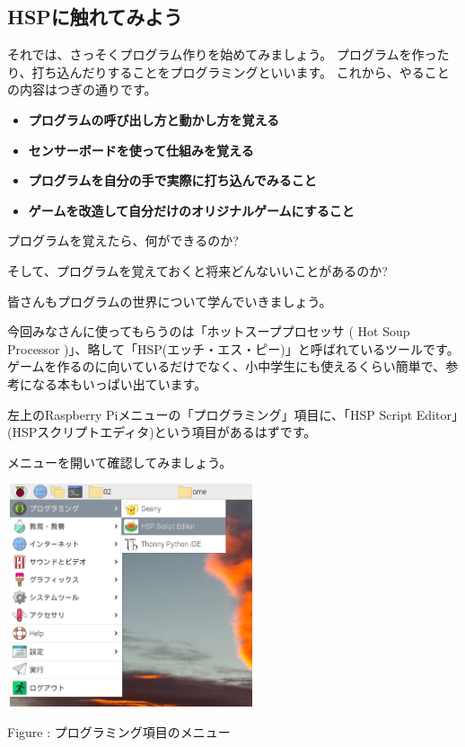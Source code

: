 \documentclass[a4paper,12pt]{jarticle}
\newcounter{Figure}
\renewcommand\theFigure{\arabic{Figure}}
\begin{document}
\bigskip
\bigskip
\bigskip

\bigskip

\clearpage
\subsection{HSPに触れてみよう}
\bigskip
\bigskip

それでは、さっそくプログラム作りを始めてみましょう。
プログラムを作ったり、打ち込んだりすることをプログラミングといいます。
これから、やることの内容はつぎの通りです。

\bigskip

\begin{itemize}
\item {\bfseries
プログラムの呼び出し方と動かし方を覚える}
\item {\bfseries
センサーボードを使って仕組みを覚える}
\item {\bfseries
プログラムを自分の手で実際に打ち込んでみること}
\item {\bfseries
ゲームを改造して自分だけのオリジナルゲームにすること}
\end{itemize}

\bigskip

プログラムを覚えたら、何ができるのか?

そして、プログラムを覚えておくと将来どんないいことがあるのか?

皆さんもプログラムの世界について学んでいきましょう。

今回みなさんに使ってもらうのは「ホットスーププロセッサ ( Hot Soup Processor )」、略して「HSP(エッチ・エス・ピー)」と呼ばれているツールです。ゲームを作るのに向いているだけでなく、小中学生にも使えるくらい簡単で、参考になる本もいっぱい出ています。


\bigskip

\bigskip

左上のRaspberry Piメニューの「プログラミング」項目に、「HSP Script Editor」(HSPスクリプトエディタ)という項目があるはずです。

メニューを開いて確認してみましょう。

\bigskip
\bigskip

\begin{minipage}{9.781cm}
\centering
{\upshape
\includegraphics[keepaspectratio,width=7.31cm,height=6.562cm]{text02-img/s_hspmenu.png}
\flushleft

Figure \stepcounter{Figure}{\theFigure}: プログラミング項目のメニュー}
\end{minipage}
\end{document}
